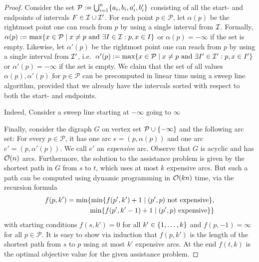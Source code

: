 \begin{proof}
Consider the set $\mathcal{P} := \bigcup_{i=1}^n \{ a_i, b_i, a'_i, b'_i \}$ consisting of all the start- and endpoints of intervals $F \in \mathcal{I} \cup \mathcal{I}'$. For each point $p \in \mathcal{P}$, let $\alpha(p)$ be the rightmost point one can reach from $p$ by using a single interval from $\mathcal{I}$. Formally, $\alpha(p) := \max\{ x \in \mathcal{P} \mid x \neq p \text{ and } \exists I \in \mathcal{I}: p, x \in I \}$ or $\alpha(p) = -\infty$ if the set is empty. Likewise, let $\alpha'(p)$ be the rightmost point one can reach from $p$ by using a single interval from $\mathcal{I}'$, i.e.\ $\alpha'(p) := \max\{ x \in \mathcal{P} \mid x \neq p \text{ and } \exists I' \in \mathcal{I}': p, x \in I' \}$ or $\alpha'(p) = -\infty$ if the set is empty. We claim that the set of all values $\alpha(p), \alpha'(p)$ for $p \in \mathcal{P}$ can be precomputed in linear time using a sweep line algorithm, provided that we already have the intervals sorted with respect to both the start- and endpoints. 

Indeed,  Consider a sweep line starting at $-\infty$ going to $\infty$ 

Finally, consider the digraph $G$ on vertex set $\mathcal{P} \cup \{ -\infty \}$ and the following arc set: For every $p \in \mathcal{P}$, it has one arc $e = (p, \alpha(p))$ and one arc $e' = (p, \alpha'(p))$. We call $e'$ an \emph{expensive} arc. Observe that $G$ is acyclic and has $\mathcal{O}(n)$ arcs. Furthermore, the solution to the assistance problem is given by the shortest path in $G$ from $s$ to $t$, which uses at most $k$ expensive arcs. But such a path can be computed using dynamic programming in $\mathcal{O}(kn)$ time, via the recursion formula
\begin{align*}
f(p, k') = \min\{ \min\{ f(p',k')+1 \mid (p',p) \text{ not expensive} \},\\ \min\{ f(p',k'-1)+1 \mid (p',p) \text{ expensive} \} \} 
\end{align*}
with starting conditions $f(s, k') = 0$ for all $k' \in \{ 1, \ldots, k \}$ and $f(p, -1) = \infty$ for all $p \in \mathcal{P}$.
It is easy to show via induction that $f(p,k')$ is the length of the shortest path from $s$ to $p$
using at most $k'$ expensive arcs. At the end $f(t,k)$ is the optimal objective value for the given assistance problem.
\end{proof}

